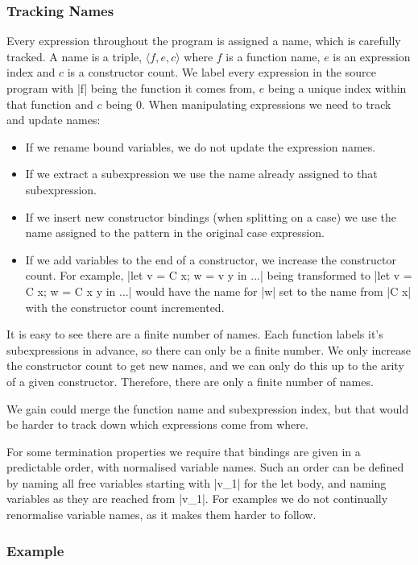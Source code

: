 \documentclass[draft]{sigplanconf}
\newcommand{\name}[3]{\ensuremath{\langle\mathsf{#1},\mathsf{#2},\mathsf{#3}\rangle}}
\begin{document}
\subsubsection{Tracking Names}

Every expression throughout the program is assigned a name, which is carefully tracked. A name is a triple, \name{\mathit{f}}{\mathit{e}}{\mathit{c}} where $f$ is a function name, $e$ is an expression index and $c$ is a constructor count. We label every expression in the source program with |f| being the function it comes from, $e$ being a unique index within that function and $c$ being $0$. When manipulating expressions we need to track and update names:

\begin{itemize}
\item If we rename bound variables, we do not update the expression names.
\item If we extract a subexpression we use the name already assigned to that subexpression.
\item If we insert new constructor bindings (when splitting on a case) we use the name assigned to the pattern in the original case expression.
\item If we add variables to the end of a constructor, we increase the constructor count. For example, |let v = C x; w = v y in ...| being transformed to |let v = C x; w = C x y in ...| would have the name for |w| set to the name from |C x| with the constructor count incremented.
\end{itemize}

It is easy to see there are a finite number of names. Each function labels it's subexpressions in advance, so there can only be a finite number. We only increase the constructor count to get new names, and we can only do this up to the arity of a given constructor. Therefore, there are only a finite number of names.

We gain could merge the function name and subexpression index, but that would be harder to track down which expressions come from where.

For some termination properties we require that bindings are given in a predictable order, with normalised variable names. Such an order can be defined by naming all free variables starting with |v_1| for the let body, and naming variables as they are reached from |v_1|. For examples we do not continually renormalise variable names, as it makes them harder to follow.

\subsubsection{Example}
\end{document}
